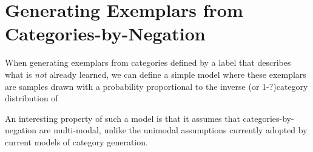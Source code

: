 \documentclass[12pt]{article} \usepackage[letterpaper, margin=1in,
\begin{document}
\section{Generating Exemplars from Categories-by-Negation}

When generating exemplars from categories defined by a label that describes what is \emph{not} already learned, we can
define a simple model where these exemplars are samples drawn with a probability proportional to the inverse (or 1-?)category
distribution of 

An interesting property of such a model is that it assumes that categories-by-negation are multi-modal, unlike the
unimodal assumptions currently adopted by current models of category generation.
\end{document}
